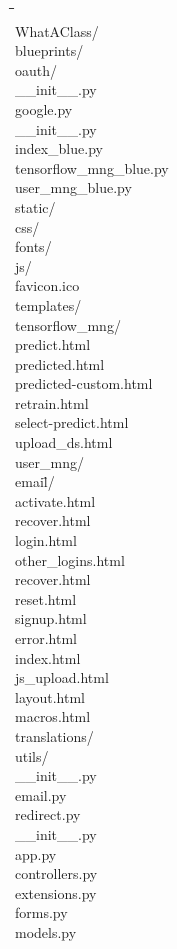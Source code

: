 \begin{tabbing}
\hphantom{tab }\= \hphantom{tab }\= \hphantom{tab }\= \hphantom{tab }\= \hphantom{tab }\= \\
WhatAClass/ \\
\> blueprints/ \\
\> \> oauth/ \\
\> \> \> \_\_init\_\_.py\\
\> \> \> google.py\\
\> \> \_\_init\_\_.py\\
\> \> index\_blue.py\\
\> \> tensorflow\_mng\_blue.py\\
\> \> user\_mng\_blue.py\\
\> static/ \\
\> \> css/ \\
\> \> fonts/\\
\> \> js/\\
\> \> favicon.ico\\
\> templates/\\
\> \> tensorflow\_mng/\\
\> \> \> predict.html\\
\> \> \> predicted.html\\
\> \> \> predicted-custom.html\\
\> \> \> retrain.html\\
\> \> \> select-predict.html\\
\> \> \> upload\_ds.html\\
\> \> user\_mng/\\
\> \> \> emai\= l/\\
\> \> \> \> activate.html \\
\> \> \> \> recover.html \\
\> \> \> login.html \\
\> \> \> other\_logins.html \\
\> \> \> recover.html \\
\> \> \> reset.html \\
\> \> \> signup.html \\
\> \> error.html \\
\> \> index.html \\
\> \> js\_upload.html \\
\> \> layout.html \\
\> \> macros.html \\
\> translations/ \\
\> utils/ \\
\> \> \_\_init\_\_.py\\
\> \> email.py\\
\> \> redirect.py\\
\> \_\_init\_\_.py\\
\> app.py\\
\> controllers.py\\
\> extensions.py\\
\> forms.py\\
\> models.py\\
\end{tabbing}


